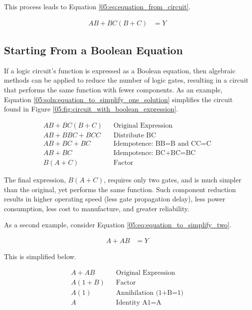 This process leads to Equation \ref{05:eq:equation_from_circuit}.

\begin{align}
  \label{05:eq:equation_from_circuit}
  AB+BC(B+C) &= Y
\end{align}

\subsection{Starting From a Boolean Equation}
\label{05:subsec:starting_from_a_boolean_equation}

If a logic circuit's function is expressed as a Boolean equation, then algebraic methods can be applied to reduce the number of logic gates, resulting in a circuit that performs the same function with fewer components. As an example, Equation \ref{05:soln:equation_to_simplify_one_solution} simplifies the circuit found in Figure \ref{05:fig:circuit_with_boolean_expression}. 

\begin{align}
\label{05:soln:equation_to_simplify_one_solution}
  AB+BC(B+C) && \text{Original Expression} \\
  \nonumber
  AB+BBC+BCC && \text{Distribute BC} \\
  \nonumber
  AB+BC+BC && \text{Idempotence: BB=B and CC=C} \\
  \nonumber
  AB+BC && \text{Idempotence: BC+BC=BC} \\
  \nonumber
  B(A+C) && \text{Factor} 
\end{align}

The final expression, $ B(A + C) $, requires only two gates, and is much simpler than the original, yet performs the same function. Such component reduction results in higher operating speed (less gate propagation delay), less power consumption, less cost to manufacture, and greater reliability. 

As a second example, consider Equation \ref{05:eq:equation_to_simplify_two}.

\begin{align}
  \label{05:eq:equation_to_simplify_two}
  A+AB &= Y
\end{align}

This is simplified below.

\begin{align}
\label{05:soln:equation_to_simplify_two}
  A+AB && \text{Original Expression} \\
  \nonumber
  A(1+B) && \text{Factor} \\
  \nonumber
  A(1) && \text{Annihilation (1+B=1)} \\
  \nonumber
  A && \text{Identity A1=A}
\end{align}

